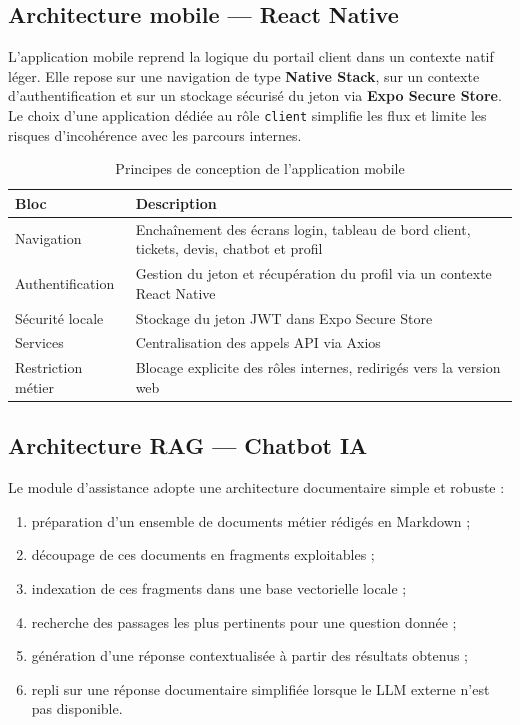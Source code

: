 \subsection{Architecture mobile --- React Native}
L'application mobile reprend la logique du portail client dans un contexte natif léger. Elle repose sur une navigation de type \textbf{Native Stack}, sur un contexte d'authentification et sur un stockage sécurisé du jeton via \textbf{Expo Secure Store}. Le choix d'une application dédiée au rôle \texttt{client} simplifie les flux et limite les risques d'incohérence avec les parcours internes.

\begin{table}[H]
\centering
\caption{Principes de conception de l'application mobile}
\label{tab:arch_mobile}
\begin{tabularx}{\textwidth}{|l|X|}
\hline
\textbf{Bloc} & \textbf{Description} \\
\hline
Navigation & Enchaînement des écrans login, tableau de bord client, tickets, devis, chatbot et profil \\
\hline
Authentification & Gestion du jeton et récupération du profil via un contexte React Native \\
\hline
Sécurité locale & Stockage du jeton JWT dans Expo Secure Store \\
\hline
Services & Centralisation des appels API via Axios \\
\hline
Restriction métier & Blocage explicite des rôles internes, redirigés vers la version web \\
\hline
\end{tabularx}
\end{table}

\subsection{Architecture RAG --- Chatbot IA}
Le module d'assistance adopte une architecture documentaire simple et robuste :
\begin{enumerate}
    \item préparation d'un ensemble de documents métier rédigés en Markdown ;
    \item découpage de ces documents en fragments exploitables ;
    \item indexation de ces fragments dans une base vectorielle locale ;
    \item recherche des passages les plus pertinents pour une question donnée ;
    \item génération d'une réponse contextualisée à partir des résultats obtenus ;
    \item repli sur une réponse documentaire simplifiée lorsque le LLM externe n'est pas disponible.
\end{enumerate}

